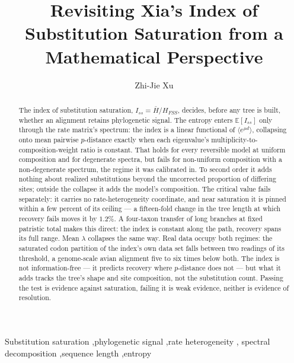 \documentclass[preprint,12pt,authoryear]{elsarticle}
\newcommand{\Iss}{I_{ss}}
\newcommand{\Hbar}{\bar H}
\newcommand{\HFSS}{H_{FSS}}
\newcommand{\E}{\mathbb{E}}
\theoremstyle{definition}
\theoremstyle{remark}
\begin{document}
\begin{frontmatter}

\title{Revisiting Xia's Index of Substitution Saturation from a Mathematical
Perspective}

\author[dhu]{Zhi-Jie Xu}

\address[dhu]{College of Biological Science \& Medical Engineering, Donghua
University, Shanghai 201620, China}

\begin{abstract}
The index of substitution saturation, $\Iss=\Hbar/\HFSS$, decides, before any
tree is built, whether an alignment retains phylogenetic signal. The entropy
enters $\E[\Iss]$ only through the rate matrix's spectrum: the index is a
linear functional of $\langle e^{\mu d}\rangle$, collapsing onto mean pairwise
$p$-distance exactly when each eigenvalue's multiplicity-to-composition-weight
ratio is constant. That holds for every reversible model at uniform composition
and for degenerate spectra, but fails for non-uniform composition with a
non-degenerate spectrum, the regime it was calibrated in. To second order it
adds nothing about realized substitutions beyond the uncorrected proportion of
differing sites; outside the collapse it adds the model's composition. The
critical value fails separately: it carries no rate-heterogeneity coordinate,
and near saturation it is pinned within a few percent of its ceiling --- a
fifteen-fold change in the tree length at which recovery fails moves it by
$1.2\%$. A four-taxon transfer of long branches at fixed patristic total makes
this direct: the index is constant along the path, recovery spans its full
range. Mean $\lambda$ collapses the same way. Real data occupy both regimes:
the saturated codon partition of the index's own data set falls between two
readings of its threshold, a genome-scale avian alignment five to six times
below both. The index is not information-free --- it predicts recovery where
$p$-distance does not --- but what it adds tracks the tree's shape and site
composition, not the substitution count. Passing the test is evidence against
saturation, failing it is weak evidence, neither is evidence of resolution.
\end{abstract}

\begin{keyword}
Substitution saturation \sep phylogenetic signal \sep rate heterogeneity \sep
spectral decomposition \sep sequence length \sep entropy
\end{keyword}

\end{frontmatter}
\end{document}
